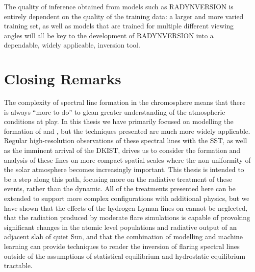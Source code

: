 The quality of inference obtained from models such as RADYNVERSION is entirely dependent on the quality of the training data: a larger and more varied training set, as well as models that are trained for multiple different viewing angles will all be key to the development of RADYNVERSION into a dependable, widely applicable, inversion tool.

\section*{Closing Remarks}

The complexity of spectral line formation in the chromosphere means that there is always ``more to do'' to glean greater understanding of the atmospheric conditions at play.
In this thesis we have primarily focused on modelling the formation of \Ha{} and \CaLine{}, but the techniques presented are much more widely applicable.
Regular high-resolution observations of these spectral lines with the SST, as well as the imminent arrival of the DKIST, drives us to consider the formation and analysis of these lines on more compact spatial scales where the non-uniformity of the solar atmosphere becomes increasingly important.
This thesis is intended to be a step along this path, focusing more on the radiative treatment of these events, rather than the dynamic.
All of the treatments presented here can be extended to support more complex configurations with additional physics, but we have shown that the effects of the hydrogen Lyman lines on \Caii{} cannot be neglected, that the radiation produced by moderate flare simulations is capable of provoking significant changes in the atomic level populations and radiative output of an adjacent slab of quiet Sun, and that the combination of modelling and machine learning can provide techniques to render the inversion of flaring spectral lines outside of the assumptions of statistical equilibrium and hydrostatic equilibrium tractable.
